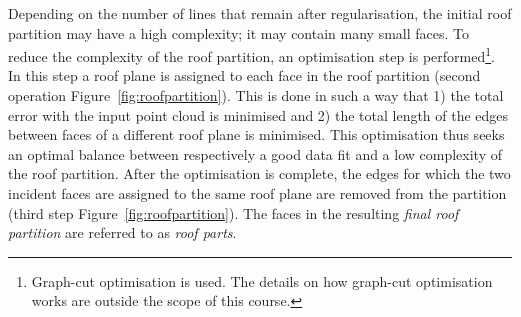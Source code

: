 Depending on the number of lines that remain after regularisation, the initial roof partition may have a high complexity; it may contain many small faces.
To reduce the complexity of the roof partition, an optimisation step is performed\footnote{Graph-cut optimisation is used. The details on how graph-cut optimisation works are outside the scope of this course.}.
In this step a roof plane is assigned to each face in the roof partition (second operation Figure~\ref{fig:roofpartition}).
This is done in such a way that 1) the total error with the input point cloud is minimised and 2) the total length of the edges between faces of a different roof plane is minimised.
This  optimisation thus seeks an optimal balance between respectively a good data fit and a low complexity of the roof partition.
After the optimisation is complete, the edges for which the two incident faces are assigned to the same roof plane are removed from the partition (third step Figure~\ref{fig:roofpartition}).
The faces in the resulting \emph{final roof partition} are referred to as \emph{roof parts}.

